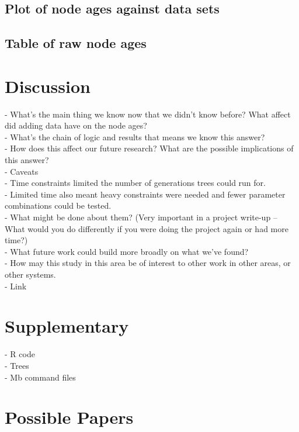 \documentclass[a4paper,11pt]{article}
\begin{document}
\subsection{Plot of node ages against data sets}

\subsection{Table of raw node ages}

\section{Discussion}

- What’s the main thing we know now that we didn’t know before? What affect did adding data have on the node ages?\\

- What’s the chain of logic and results that means we know this answer?\\ %

- How does this affect our future research? What are the possible implications of this answer?\\

- Caveats\\
- Time constraints limited the number of generations trees could run for.\\  %
- Limited time also meant heavy constraints were needed and fewer parameter combinations could be tested.\\
- What might be done about them? (Very important in a project write-up -- What would you do differently if you were doing the project again or had more time?)\\

- What future work could build more broadly on what we’ve found?\\
- How may this study in this area be of interest to other work in other areas, or other systems.\\

- Link\\

\section{Supplementary}

- R code\\
- Trees\\{}
- Mb command files\\ 

\section{Possible Papers}

\citep{halliday2016eutherian}
\citep{halliday2016impact}
\citep{halliday2017resolving}
\citep{halliday2016eutherians}
\citep{beck2014ancient}
\citep{arcila2015evaluation}
\citep{near2004assessing}
\citep{lee2015morphological}
\citep{puttick2016dating}
\citep{pyron2016novel}
\citep{turner2017empirical}
\citep{heath2014fossilized}
\citep{wiens2004role}
\citep{nabhan2011impact}



\end{document}

